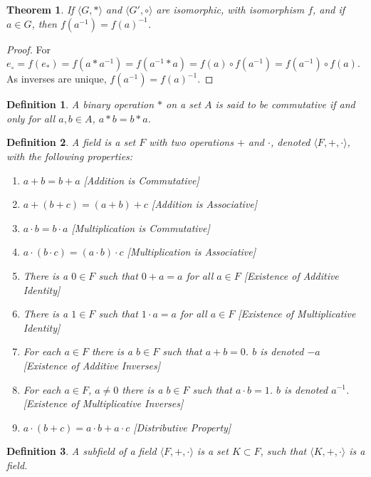 \documentclass[12pt,oneside]{book}
\theoremstyle{mystyle}
\newtheorem{theorem}{Theorem}[section]
\newtheorem{definition}{Definition}[section]
\begin{document}
\begin{theorem}
If $\langle G, * \rangle$ and $\langle G', \circ \rangle$ are isomorphic, with isomorphism $f$, and if $a\in G$, then $f(a^{-1}) = f(a)^{-1}$.
\end{theorem}
\begin{proof}
For $e_{\circ}=f(e_*) = f(a*a^{-1}) = f(a^{-1}*a) = f(a)\circ f(a^{-1})=f(a^{-1})\circ f(a)$. As inverses are unique, $f(a^{-1})=f(a)^{-1}$.
\end{proof}

\begin{definition}
A binary operation $*$ on a set $A$ is said to be commutative if and only for all $a,b\in A$, $a*b = b*a$.
\end{definition}

\begin{definition}
A field is a set $F$ with two operations $+$ and $\cdot$, denoted $\langle F, +,\cdot \rangle$, with the following properties:
\begin{enumerate}
\item $a+b=b+a$ \hfill [Addition is Commutative]
\item $a+(b+c)=(a+b)+c$ \hfill [Addition is Associative]
\item $a\cdot b = b\cdot a$ \hfill [Multiplication is Commutative]
\item $a\cdot (b\cdot c) = (a\cdot b)\cdot c$ \hfill [Multiplication is Associative]
\item There is a $0\in F$ such that $0+a=a$ for all $a\in F$ \hfill [Existence of Additive Identity]
\item There is a $1\in F$ such that $1\cdot a = a$ for all $a\in F$ \hfill [Existence of Multiplicative Identity]
\item For each $a\in F$ there is a $b\in F$ such that $a+b = 0$. $b$ is denoted $-a$ \hfill [Existence of Additive Inverses]
\item For each $a\in F$, $a\ne 0$ there is a $b\in F$ such that $a\cdot b = 1$. $b$ is denoted $a^{-1}$. \hfill [Existence of Multiplicative Inverses]
\item $a\cdot(b+c) = a\cdot b + a\cdot c$ \hfill [Distributive Property]
\end{enumerate}
\end{definition}

\begin{definition}
A subfield of a field $\langle F,+,\cdot \rangle$ is a set $K\subset F$, such that $\langle K, +,\cdot \rangle$ is a field.
\end{definition}
\end{document}
